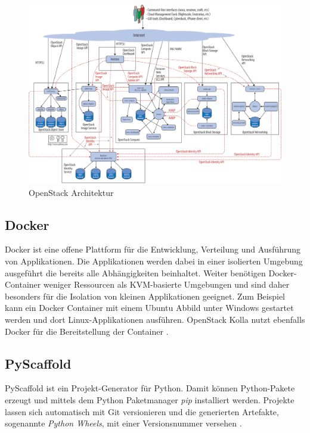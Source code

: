 \documentclass[../Main.tex]{subfiles}
\begin{document}
\begin{figure}[h]
    \centering
    \includegraphics[width=0.9\columnwidth]{Images/OpenstackArchitecture.png}
    \caption{OpenStack Architektur \citep{OpenStackArchitecture}}
\end{figure}

\subsection{Docker}
Docker ist eine offene Plattform für die Entwicklung, Verteilung und Ausführung von Applikationen. Die Applikationen werden dabei in einer isolierten
Umgebung ausgeführt die bereits alle Abhängigkeiten beinhaltet. Weiter benötigen Docker-Container weniger Ressourcen
als KVM-basierte Umgebungen und sind daher besonders für die Isolation von kleinen Applikationen geeignet.
Zum Beispiel kann ein Docker Container mit einem Ubuntu Abbild unter Windows gestartet werden und dort Linux-Applikationen ausführen.
OpenStack Kolla nutzt ebenfalls Docker für die Bereitstellung der Container \citep{Docker}.

\subsection{PyScaffold}
PyScaffold ist ein Projekt-Generator für Python. Damit können Python-Pakete erzeugt und mittels dem Python Paketmanager \textit{pip} installiert werden.
Projekte lassen sich automatisch mit Git versionieren und die generierten Artefakte, sogenannte \textit{Python Wheels}, mit einer Versionsnummer versehen \citep{PyScaffold}.



\biblio %
\end{document}
